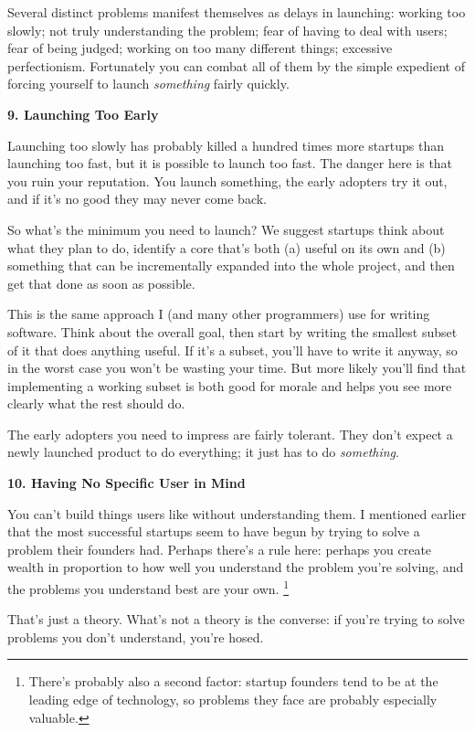 \documentclass[12pt]{book}
\begin{document}
Several distinct problems manifest themselves as delays in launching:
working too slowly; not truly understanding the problem; fear of having
to deal with users; fear of being judged; working on too many different
things; excessive perfectionism. Fortunately you can combat all of them
by the simple expedient of forcing yourself to launch \emph{something}
fairly quickly.

\textbf{9. Launching Too Early}

Launching too slowly has probably killed a hundred times more startups
than launching too fast, but it is possible to launch too fast. The
danger here is that you ruin your reputation. You launch something, the
early adopters try it out, and if it's no good they may never come back.

So what's the minimum you need to launch? We suggest startups think
about what they plan to do, identify a core that's both (a) useful on
its own and (b) something that can be incrementally expanded into the
whole project, and then get that done as soon as possible.

This is the same approach I (and many other programmers) use for writing
software. Think about the overall goal, then start by writing the
smallest subset of it that does anything useful. If it's a subset,
you'll have to write it anyway, so in the worst case you won't be
wasting your time. But more likely you'll find that implementing a
working subset is both good for morale and helps you see more clearly
what the rest should do.

The early adopters you need to impress are fairly tolerant. They don't
expect a newly launched product to do everything; it just has to do
\emph{something}.

\textbf{10. Having No Specific User in Mind}

You can't build things users like without understanding them. I
mentioned earlier that the most successful startups seem to have begun
by trying to solve a problem their founders had. Perhaps there's a rule
here: perhaps you create wealth in proportion to how well you understand
the problem you're solving, and the problems you understand best are
your own. \footnote{There's probably also a second factor: startup founders tend to
be at the leading edge of technology, so problems they face are probably
especially valuable.}

That's just a theory. What's not a theory is the converse: if you're
trying to solve problems you don't understand, you're hosed.
\end{document}

